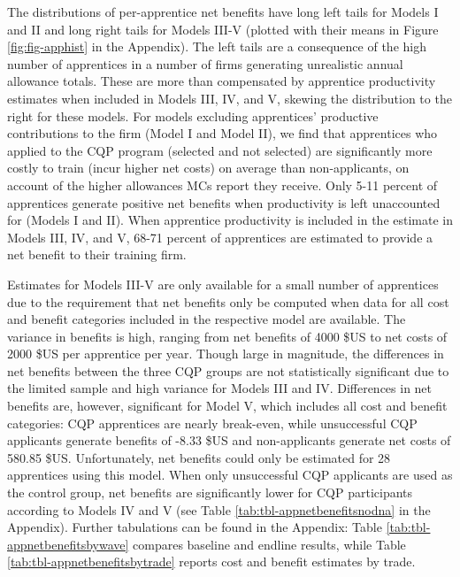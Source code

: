\documentclass[
  11pt,
a4paper
]{report}
\begin{document}
The distributions of per-apprentice net benefits have long left tails for Models I and II and long right tails for Models III-V (plotted with their means in Figure \ref{fig:fig-apphist} in the Appendix). The left tails are a consequence of the high number of apprentices in a number of firms generating unrealistic annual allowance totals. These are more than compensated by apprentice productivity estimates when included in Models III, IV, and V, skewing the distribution to the right for these models. For models excluding apprentices' productive contributions to the firm (Model I and Model II), we find that apprentices who applied to the CQP program (selected and not selected) are significantly more costly to train (incur higher net costs) on average than non-applicants, on account of the higher allowances MCs report they receive. Only 5-11 percent of apprentices generate positive net benefits when productivity is left unaccounted for (Models I and II). When apprentice productivity is included in the estimate in Models III, IV, and V, 68-71 percent of apprentices are estimated to provide a net benefit to their training firm.

Estimates for Models III-V are only available for a small number of apprentices due to the requirement that net benefits only be computed when data for all cost and benefit categories included in the respective model are available. The variance in benefits is high, ranging from net benefits of 4000 \$US to net costs of 2000 \$US per apprentice per year. Though large in magnitude, the differences in net benefits between the three CQP groups are not statistically significant due to the limited sample and high variance for Models III and IV. Differences in net benefits are, however, significant for Model V, which includes all cost and benefit categories: CQP apprentices are nearly break-even, while unsuccessful CQP applicants generate benefits of -8.33 \$US and non-applicants generate net costs of 580.85 \$US. Unfortunately, net benefits could only be estimated for 28 apprentices using this model. When only unsuccessful CQP applicants are used as the control group, net benefits are significantly lower for CQP participants according to Models IV and V (see Table \ref{tab:tbl-appnetbenefitsnodna} in the Appendix). Further tabulations can be found in the Appendix: Table \ref{tab:tbl-appnetbenefitsbywave} compares baseline and endline results, while Table \ref{tab:tbl-appnetbenefitsbytrade} reports cost and benefit estimates by trade.
\end{document}

